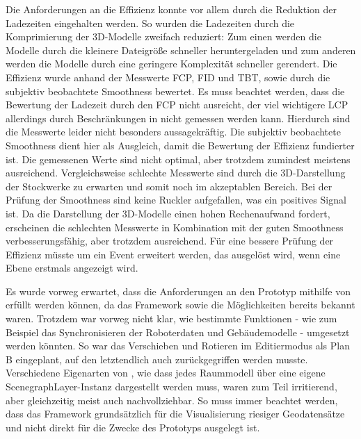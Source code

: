 Die Anforderungen an die Effizienz konnte vor allem durch die Reduktion der Ladezeiten eingehalten werden. So wurden die Ladezeiten durch die Komprimierung der 3D-Modelle zweifach reduziert: Zum einen werden die Modelle durch die kleinere Dateigröße schneller heruntergeladen und zum anderen werden die Modelle durch eine geringere Komplexität schneller gerendert. Die Effizienz wurde anhand der Messwerte \ac{FCP}, \ac{FID} und \ac{TBT}, sowie durch die subjektiv beobachtete Smoothness bewertet. Es muss beachtet werden, dass die Bewertung der Ladezeit durch den \ac{FCP} nicht ausreicht, der viel wichtigere \ac{LCP} allerdings durch Beschränkungen in \deckgl nicht gemessen werden kann. Hierdurch sind die Messwerte leider nicht besonders aussagekräftig. Die subjektiv beobachtete Smoothness dient hier als Ausgleich, damit die Bewertung der Effizienz fundierter ist. Die gemessenen Werte sind nicht optimal, aber trotzdem zumindest meistens ausreichend. Vergleichsweise schlechte Messwerte sind durch die 3D-Darstellung der Stockwerke zu erwarten und somit noch im akzeptablen Bereich. Bei der Prüfung der Smoothness sind keine Ruckler aufgefallen, was ein positives Signal ist. Da die Darstellung der 3D-Modelle einen hohen Rechenaufwand fordert, erscheinen die schlechten Messwerte in Kombination mit der guten Smoothness verbesserungsfähig, aber trotzdem ausreichend. Für eine bessere Prüfung der Effizienz müsste \deckgl um ein Event erweitert werden, das ausgelöst wird, wenn eine Ebene erstmals angezeigt wird.

Es wurde vorweg erwartet, dass die Anforderungen an den Prototyp mithilfe von \deckgl{} erfüllt werden können, da das Framework sowie die Möglichkeiten bereits bekannt waren. Trotzdem war vorweg nicht klar, wie bestimmte Funktionen - wie zum Beispiel das Synchronisieren der Roboterdaten und Gebäudemodelle - umgesetzt werden könnten. So war das Verschieben und Rotieren im Editiermodus als Plan B eingeplant, auf den letztendlich auch zurückgegriffen werden musste. Verschiedene Eigenarten von \deckgl{}, wie dass jedes Raummodell über eine eigene ScenegraphLayer-Instanz dargestellt werden muss, waren zum Teil irritierend, aber gleichzeitig meist auch nachvollziehbar. So muss immer beachtet werden, dass das Framework grundsätzlich für die Visualisierung riesiger Geodatensätze und nicht direkt für die Zwecke des Prototyps ausgelegt ist.

